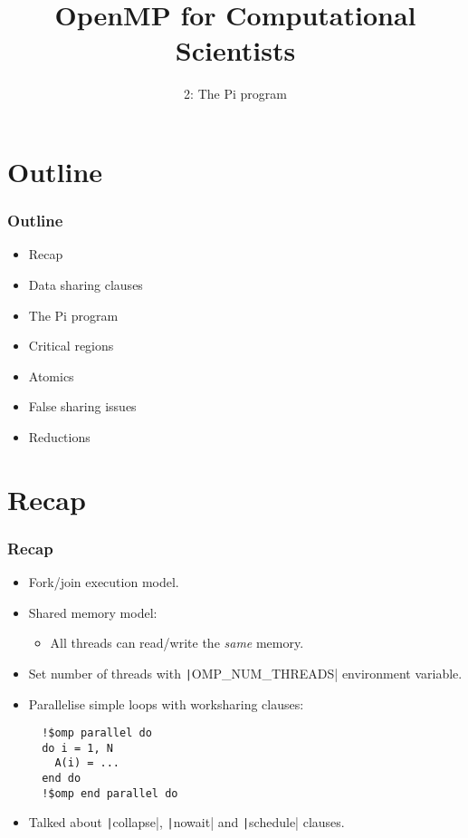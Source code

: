 \documentclass{beamer}
\title{OpenMP for Computational Scientists}
\subtitle{2: The Pi program}
\begin{document}
\frame{\titlepage}


\section{Outline}
\begin{frame}
\frametitle{Outline}
\begin{itemize}
  \item Recap
  \item Data sharing clauses
  \item The Pi program
  \item Critical regions
  \item Atomics
  \item False sharing issues
  \item Reductions
\end{itemize}
\end{frame}
\section{Recap}
\begin{frame}[fragile]
\frametitle{Recap}
\begin{itemize}
  \item Fork/join execution model.

  \item Shared memory model:
    \begin{itemize}
      \item All threads can read/write the \emph{same} memory.
    \end{itemize}

  \item Set number of threads with \texttt|OMP_NUM_THREADS| environment variable.

  \item Parallelise simple loops with worksharing clauses:
  \begin{verbatim}
  !$omp parallel do
  do i = 1, N
    A(i) = ...
  end do
  !$omp end parallel do
  \end{verbatim}

  \item Talked about \texttt|collapse|, \texttt|nowait| and \texttt|schedule| clauses.

\end{itemize}
\end{frame}
\end{document}
